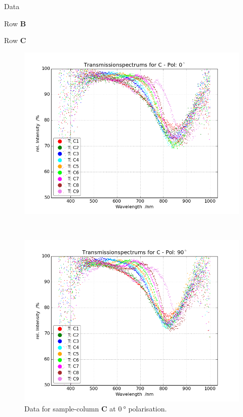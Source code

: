 \begin{appendix}
\begin{chapter}{Data}
\begin{section}{Row \textbf{B}}
    \end{section}
    
    
    
    \newpage
    \begin{section}{Row \textbf{C}}
      \label{Appendix:DataC}
      
      \begin{figure}[ht!]
        \centering
        \begin{minipage}{.92\textwidth}
          \centering
          \includegraphics[width=\textwidth]{Figures/TransspecRAW_CPol0.png}
          \caption{Data for sample-column \textbf{C} at $\SI{0}{\degree}$
              polarisation.}
          \label{fig:TransspecRAW_CPol0}
        \end{minipage}\\
        \begin{minipage}{.92\textwidth}
          \centering
          \includegraphics[width=\textwidth]{Figures/TransspecRAW_CPol90.png}

\end{minipage}
\end{figure}
\end{section}
\end{chapter}
\end{appendix}
